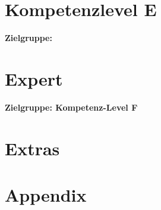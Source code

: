 \documentclass[
ngerman,
paper=a4,
asymmetric,
fontsize=9.5pt,
draft=false,
numbers=noenddot,
footnotes=multiple,
toc=flat,
]{scrbook}
\begin{document}
\part{Kompetenzlevel E}

{\sffamily\noindent \textbf{Zielgruppe: }
}


\setcounter{chapter}{500}
%	
%
%
%
%
%
%
\part{Expert}\setcounter{chapter}{400}

{\sffamily\noindent \textbf{Zielgruppe: Kompetenz-Level F}
}

\part{Extras}\setcounter{chapter}{500}
%

\appendix
\part{Appendix}
\end{document}
